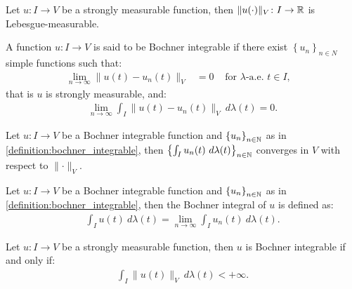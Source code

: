 \begin{lemma}
    Let $u\colon I \rightarrow V$ be a strongly measurable function, then $\lVert u(\cdot) \rVert_V \colon I \rightarrow \mathbb{R}$ is Lebesgue-measurable.
\end{lemma}

\begin{definition} \label{definition:bochner_integrable}
    A function $u\colon I \rightarrow V$ is said to be Bochner integrable if there exist $\left\{ u_n \right\}_{n \in N}$ simple functions such that:
    \begin{align}
        \lim_{n \rightarrow \infty} \lVert u(t) - u_n(t) \rVert_V &= 0 &\text{ for } \lambda \text{-a.e. } t \in I,
&    \end{align}
    that is  $u$ is strongly measurable, and:
    \begin{align}
        \lim_{n \rightarrow \infty} \int_I \lVert u(t) - u_n(t) \rVert_V ~ d \lambda(t) = 0.
    \end{align}
\end{definition}

\begin{lemma}
    Let $u\colon I \rightarrow V$ be a Bochner integrable function and $\left\{ u_n \right\}_{n \in \mathbb{N}}$ as in \cref{definition:bochner_integrable}, then $\left\{ \int_I u_n(t) ~ d \lambda(t) \right\}_{n \in \mathbb{N}}$ converges in $V$ with respect to $\lVert \cdot \rVert_V$.
\end{lemma}

\begin{definition}
    Let $u\colon I \rightarrow V$ be a Bochner integrable function and $\left\{ u_n \right\}_{n \in \mathbb{N}}$ as in \cref{definition:bochner_integrable}, then the Bochner integral of $u$ is defined as:
    \begin{align}
        \int_I u(t) ~ d \lambda(t) = \lim_{n \rightarrow \infty} \int_I u_n(t) ~ d \lambda(t).
    \end{align}
\end{definition}

\begin{theorem}[Bochner]
    Let $u\colon I \rightarrow V$ be a strongly measurable function, then $u$ is Bochner integrable if and only if:
    \begin{align}
        \int_I \lVert u(t) \rVert_V ~ d \lambda(t) < + \infty.
    \end{align}
\end{theorem}


